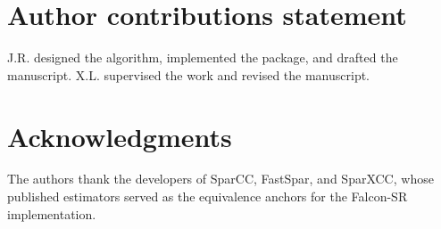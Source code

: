 \documentclass[unnumsec,webpdf,contemporary,large]{oup-authoring-template}
\theoremstyle{thmstyleone}
\theoremstyle{thmstyletwo}
\theoremstyle{thmstylethree}
\begin{document}
\section{Author contributions statement}
J.R. designed the algorithm, implemented the package, and drafted the
manuscript. X.L. supervised the work and revised the manuscript.

\section{Acknowledgments}
The authors thank the developers of SparCC, FastSpar, and SparXCC,
whose published estimators served as the equivalence anchors for the
Falcon-SR implementation.



\end{document}
